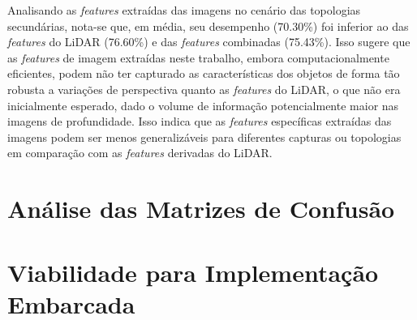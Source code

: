 Analisando as \textit{features} extraídas das imagens no cenário das topologias secundárias, nota-se que, em média, seu desempenho (70.30\%) foi inferior ao das \textit{features} do LiDAR (76.60\%) e das \textit{features} combinadas (75.43\%). Isso sugere que as \textit{features} de imagem extraídas neste trabalho, embora computacionalmente eficientes, podem não ter capturado as características dos objetos de forma tão robusta a variações de perspectiva quanto as \textit{features} do LiDAR, o que não era inicialmente esperado, dado o volume de informação potencialmente maior nas imagens de profundidade. Isso indica que as \textit{features} específicas extraídas das imagens podem ser menos generalizáveis para diferentes capturas ou topologias em comparação com as \textit{features} derivadas do LiDAR.

\section{Análise das Matrizes de Confusão}

\section{Viabilidade para Implementação Embarcada}
